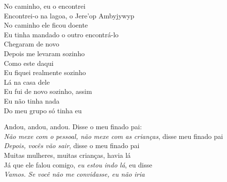 \begin{linenumbers}
 
\noindent   No caminho, eu o encontrei\\
  Encontrei-o na lagoa, o Jere'op Ambyjywyp\\
  No caminho ele ficou doente\\
  Eu tinha mandado o outro encontrá-lo\\
  Chegaram de novo\\
  Depois me levaram sozinho\\
  Como este daqui\\
  Eu fiquei realmente sozinho\\
  Lá na casa dele\\
  Eu fui de novo sozinho, assim\\
  Eu não tinha nada\\
  Do meu grupo só tinha eu
 
\end{linenumbers}

\bigskip

\begin{linenumbers}
 
\noindent   Andou, andou, andou. Disse o meu finado pai:\\
  \textit{Não mexe com o pessoal, não mexe com as crianças}, disse meu finado pai\\
  \textit{Depois, vocês vão sair}, disse o meu finado pai\\
  Muitas mulheres, muitas crianças, havia lá\\
  Já que ele falou comigo, \textit{eu estou indo lá}, eu disse\\
  \textit{Vamos. Se você não me convidasse, eu não iria}
 
\end{linenumbers}

